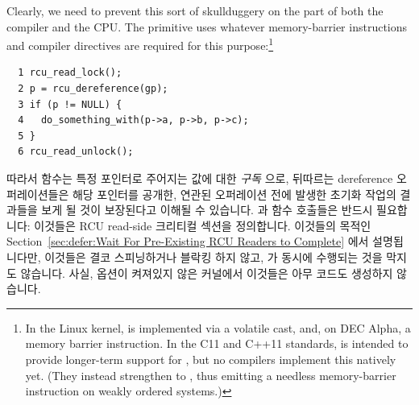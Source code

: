Clearly, we need to prevent this sort of skullduggery on the
part of both the compiler and the CPU.
The  primitive uses
whatever memory-barrier instructions and compiler
directives are required for this purpose:\footnote{
	In the Linux kernel,  is implemented via
	a volatile cast, and, on DEC Alpha, a memory barrier instruction.
	In the C11 and C++11 standards, 
	is intended to provide longer-term support for ,
	but no compilers implement this natively yet.
	(They instead strengthen  to
	, thus emitting a needless memory-barrier
	instruction on weakly ordered systems.)}
\fi

\vspace{5pt}
\begin{minipage}[t]{\columnwidth}
\scriptsize
\begin{verbatim}
  1 rcu_read_lock();
  2 p = rcu_dereference(gp);
  3 if (p != NULL) {
  4   do_something_with(p->a, p->b, p->c);
  5 }
  6 rcu_read_unlock();
\end{verbatim}
\end{minipage}
\vspace{5pt}

따라서  함수는 특정 포인터로 주어지는 값에 대한
\emph{구독} 으로, 뒤따르는 dereference 오퍼레이션들은 해당 포인터를 공개한,
연관된  오퍼레이션 전에 발생한 초기화 작업의 결과들을
보게 될 것이 보장된다고 이해될 수 있습니다.
 과  함수 호출들은 반드시 필요합니다:
이것들은 RCU read-side 크리티컬 섹션을 정의합니다.
이것들의 목적인
Section~\ref{sec:defer:Wait For Pre-Existing RCU Readers to Complete} 에서
설명됩니다만, 이것들은 결코 스피닝하거나 블락킹 하지 않고, 
가 동시에 수행되는 것을 막지도 않습니다.
사실,  옵션이 켜져있지 않은 커널에서 이것들은 아무 코드도
생성하지 않습니다.

